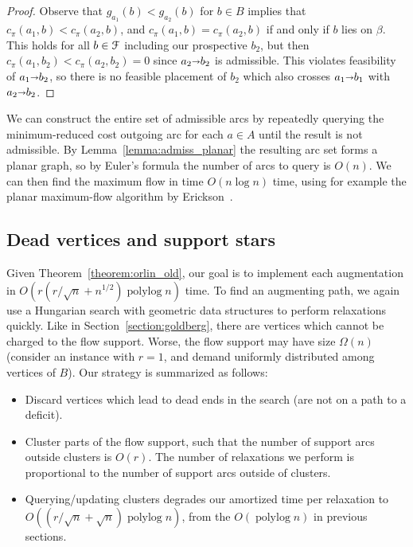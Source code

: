 \documentclass[a4paper,UKenglish]{socg-lipics-v2018}
\def\polylog{\mathop{\mathrm{polylog}}}
\def\arcto{\mathord\shortrightarrow}
\def\arc#1#2{#1\arcto#2}
\theoremstyle{plain}
\numberwithin{figure}{section}
\begin{document}
\begin{toappendix}
\begin{proof}
Observe that $g_{a_1}(b) < g_{a_2}(b)$ for $b \in B$ implies that
$c_\pi(a_1, b) < c_\pi(a_2, b)$, and $c_\pi(a_1, b) = c_\pi(a_2, b)$ if and
only if $b$ lies on $\beta$.
This holds for all $b \in \EuScript{F}$ including our prospective $b_2$,
but then $c_\pi(a_1, b_2) < c_\pi(a_2, b_2) = 0$ since $\arc{a_2}{b_2}$ is
admissible.
This violates feasibility of $\arc{a_1}{b_2}$, so there is no feasible
placement of $b_2$ which also crosses $\arc{a_1}{b_1}$ with $\arc{a_2}{b_2}$.
\end{proof}

We can construct the entire set of admissible arcs by repeatedly querying
the minimum-reduced cost outgoing arc for each $a \in A$ until the result is
not admissible.
By Lemma~\ref{lemma:admiss_planar} the resulting arc set forms a planar graph,
so by Euler's formula the number of arcs to query is $O(n)$.
We can then find the maximum flow in time $O(n\log n)$ time, using for example the
planar maximum-flow algorithm by Erickson~\cite{E10}. \cite{Other citations like Klein}

\end{toappendix}

\subsection{Dead vertices and support stars}

Given Theorem~\ref{theorem:orlin_old}, our goal is to implement each
augmentation in $O(r(r/\sqrt{n} + n^{1/2})\polylog n)$ time.
To find an augmenting path, we again use a Hungarian search with geometric data
structures to perform relaxations quickly.
Like in Section~\ref{section:goldberg}, there are vertices which cannot be
charged to the flow support.
Worse, the flow support may have size $\Omega(n)$ (consider an instance with
$r=1$, and demand uniformly distributed among vertices of $B$).
Our strategy is summarized as follows:
\begin{itemize}
\item Discard vertices which lead to dead ends in the search (are not on a path
	to a deficit).
\item Cluster parts of the flow support, such that the number of support arcs
	outside clusters is $O(r)$.
	The number of relaxations we perform is proportional to the number of
	support arcs outside of clusters.
\item Querying/updating clusters degrades our amortized time per relaxation to
	$O((r/\sqrt{n}+\sqrt{n})\polylog n)$, from the $O(\polylog n)$ in
	previous sections.
\end{itemize}
\end{document}
